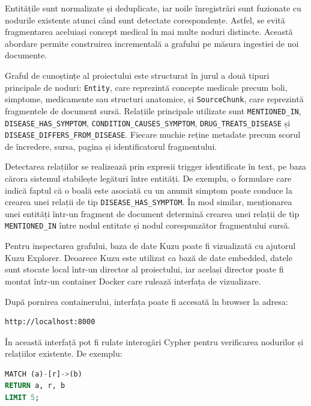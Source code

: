\documentclass[12pt, a4paper, oneside, romanian]{teza-upb}
\begin{document}
Entitățile sunt normalizate și deduplicate, iar noile înregistrări sunt fuzionate cu nodurile existente atunci când sunt detectate corespondențe. Astfel, se evită fragmentarea aceluiași concept medical în mai multe noduri distincte. Această abordare permite construirea incrementală a grafului pe măsura ingestiei de noi documente.

Graful de cunoștințe al proiectului este structurat în jurul a două tipuri principale de noduri: \texttt{Entity}, care reprezintă concepte medicale precum boli, simptome, medicamente sau structuri anatomice, și \texttt{SourceChunk}, care reprezintă fragmentele de document sursă. Relațiile principale utilizate sunt \texttt{MENTIONED\_IN}, \texttt{DISEASE\_HAS\_SYMPTOM}, \texttt{CONDITION\_CAUSES\_SYMPTOM}, \texttt{DRUG\_TREATS\_DISEASE} și \texttt{DISEASE\_DIFFERS\_FROM\_DISEASE}. Fiecare muchie reține metadate precum scorul de încredere, sursa, pagina și identificatorul fragmentului.

Detectarea relațiilor se realizează prin expresii trigger identificate în text, pe baza cărora sistemul stabilește legături între entități. De exemplu, o formulare care indică faptul că o boală este asociată cu un anumit simptom poate conduce la crearea unei relații de tip \texttt{DISEASE\_HAS\_SYMPTOM}. În mod similar, menționarea unei entități într-un fragment de document determină crearea unei relații de tip \texttt{MENTIONED\_IN} între nodul entitate și nodul corespunzător fragmentului sursă.

Pentru inspectarea grafului, baza de date Kuzu poate fi vizualizată cu ajutorul Kuzu Explorer. Deoarece Kuzu este utilizat ca bază de date embedded, datele sunt stocate local într-un director al proiectului, iar același director poate fi montat într-un container Docker care rulează interfața de vizualizare.

După pornirea containerului, interfața poate fi accesată în browser la adresa:

\begin{lstlisting}
http://localhost:8000
\end{lstlisting}

În această interfață pot fi rulate interogări Cypher pentru verificarea nodurilor și relațiilor existente. De exemplu:

\begin{center}
\begin{minipage}{0.42\textwidth}
\begin{lstlisting}[language=SQL, frame=single, framesep=4pt]
MATCH (a)-[r]->(b)
RETURN a, r, b
LIMIT 5;
\end{lstlisting}
\end{minipage}
\end{center}
\end{document}
